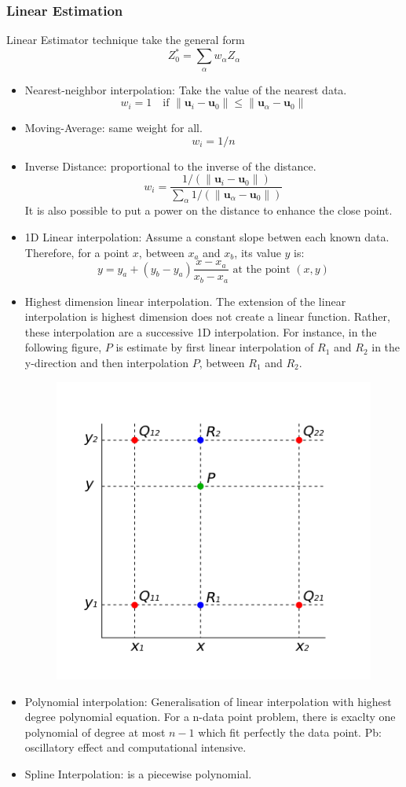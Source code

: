 \documentclass[twocolumn]{article}
\numberwithin{equation}{section}
\begin{document}
\subsubsection{Linear Estimation}
Linear Estimator technique take the general form
\begin{equation}
Z^*_0 = \sum_\alpha w_\alpha Z_\alpha
\end{equation}
\begin{itemize}
\item Nearest-neighbor interpolation: Take the value of the nearest data.
$$w_i = 1 \quad \text{if } \|\boldsymbol{u}_i - \boldsymbol{u}_0\| \le \|\boldsymbol{u}_\alpha - \boldsymbol{u}_0\| $$
\item Moving-Average: same weight for all.
$$w_i = 1/n$$
\item Inverse Distance: proportional to the inverse of the distance.
$$w_i = \frac{1/(\|\boldsymbol{u}_i - \boldsymbol{u}_0\|)}{\sum_\alpha 1/(\|\boldsymbol{u}_\alpha - \boldsymbol{u}_0\|)}$$
It is also possible to put a power on the distance to enhance the close point.
\item 1D Linear interpolation: Assume a constant slope betwen each known data. Therefore, for a point $x$, between $x_a$ and $x_b$, its value $y$ is:
$$ y = y_a + \left( y_b-y_a \right) \frac{x-x_a}{x_b-x_a} \text{ at the point } \left( x,y \right) $$
\item Highest dimension linear interpolation. The extension of the linear interpolation is highest dimension does not create a linear function. Rather, these interpolation are a successive 1D interpolation. For instance, in the following figure, $P$ is estimate by first linear interpolation of $R_1$ and $R_2$ in the y-direction and then interpolation $P$, between $R_1$ and $R_2$.
\begin{figure}[H]
	\centering
	\includegraphics[width=.2\textwidth]{Images/BilinearInterpolation.png}
\end{figure}
\item Polynomial interpolation: Generalisation of linear interpolation with highest degree polynomial equation. For a n-data point problem, there is exaclty one polynomial of degree at most $n-1$ which fit perfectly the data point. Pb: oscillatory effect and computational intensive.
\item Spline Interpolation: is a piecewise polynomial. 
\end{itemize}
\end{document}
